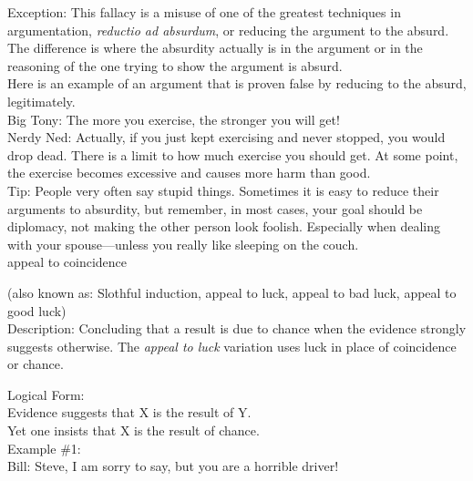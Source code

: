 \documentclass[a4paper,12pt,single,pdftex]{scrbook}
\begin{document}
    
      Exception: This fallacy is a misuse of one of the greatest techniques in argumentation, {\it reductio ad absurdum}, or reducing the argument to the absurd.  The difference is where the absurdity actually is in the argument or in the reasoning of the one trying to show the argument is absurd.
    \\

    
      Here is an example of an argument that is proven false by reducing to the absurd, legitimately.
    \\

    
      Big Tony: The more you exercise, the stronger you will get!
    \\

    
      Nerdy Ned: Actually, if you just kept exercising and never stopped, you would drop dead. There is a limit to how much exercise you should get. At some point, the exercise becomes excessive and causes more harm than good.
    \\

    
      Tip: People very often say stupid things.  Sometimes it is easy to reduce their arguments to absurdity, but remember, in most cases, your goal should be diplomacy, not making the other person look foolish.  Especially when dealing with your spouse—unless you really like sleeping on the couch.
    \\

  

appeal to coincidence
    
      (also known as: Slothful induction, appeal to luck, appeal to bad luck, appeal to good luck)
    \\

  
    Description: Concluding that a result is due to chance when the evidence strongly suggests otherwise.  The {\it appeal to luck}  variation uses luck in place of coincidence or chance.

    
      Logical Form:
    \\

    
      Evidence suggests that X is the result of Y.
    \\

    
      Yet one insists that X is the result of chance.
    \\

    
      Example \#1: 
    \\

    
      Bill: Steve, I am sorry to say, but you are a horrible driver!
    \\
\end{document}
